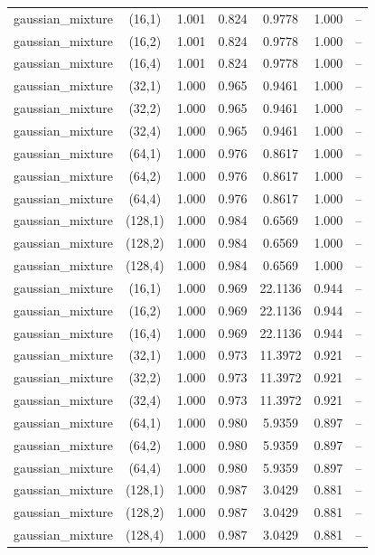 \begin{tabular}{lcccccc}
gaussian\_mixture & (16,1) & 1.001 & 0.824 & 0.9778 & 1.000 & -- \\
gaussian\_mixture & (16,2) & 1.001 & 0.824 & 0.9778 & 1.000 & -- \\
gaussian\_mixture & (16,4) & 1.001 & 0.824 & 0.9778 & 1.000 & -- \\
gaussian\_mixture & (32,1) & 1.000 & 0.965 & 0.9461 & 1.000 & -- \\
gaussian\_mixture & (32,2) & 1.000 & 0.965 & 0.9461 & 1.000 & -- \\
gaussian\_mixture & (32,4) & 1.000 & 0.965 & 0.9461 & 1.000 & -- \\
gaussian\_mixture & (64,1) & 1.000 & 0.976 & 0.8617 & 1.000 & -- \\
gaussian\_mixture & (64,2) & 1.000 & 0.976 & 0.8617 & 1.000 & -- \\
gaussian\_mixture & (64,4) & 1.000 & 0.976 & 0.8617 & 1.000 & -- \\
gaussian\_mixture & (128,1) & 1.000 & 0.984 & 0.6569 & 1.000 & -- \\
gaussian\_mixture & (128,2) & 1.000 & 0.984 & 0.6569 & 1.000 & -- \\
gaussian\_mixture & (128,4) & 1.000 & 0.984 & 0.6569 & 1.000 & -- \\
gaussian\_mixture & (16,1) & 1.000 & 0.969 & 22.1136 & 0.944 & -- \\
gaussian\_mixture & (16,2) & 1.000 & 0.969 & 22.1136 & 0.944 & -- \\
gaussian\_mixture & (16,4) & 1.000 & 0.969 & 22.1136 & 0.944 & -- \\
gaussian\_mixture & (32,1) & 1.000 & 0.973 & 11.3972 & 0.921 & -- \\
gaussian\_mixture & (32,2) & 1.000 & 0.973 & 11.3972 & 0.921 & -- \\
gaussian\_mixture & (32,4) & 1.000 & 0.973 & 11.3972 & 0.921 & -- \\
gaussian\_mixture & (64,1) & 1.000 & 0.980 & 5.9359 & 0.897 & -- \\
gaussian\_mixture & (64,2) & 1.000 & 0.980 & 5.9359 & 0.897 & -- \\
gaussian\_mixture & (64,4) & 1.000 & 0.980 & 5.9359 & 0.897 & -- \\
gaussian\_mixture & (128,1) & 1.000 & 0.987 & 3.0429 & 0.881 & -- \\
gaussian\_mixture & (128,2) & 1.000 & 0.987 & 3.0429 & 0.881 & -- \\
gaussian\_mixture & (128,4) & 1.000 & 0.987 & 3.0429 & 0.881 & -- \\

\end{tabular}
